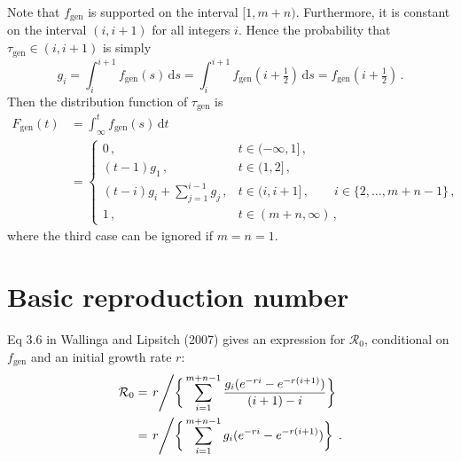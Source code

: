 \documentclass[12pt]{article}
\newcommand{\tgen}{\tau_\text{gen}}
\newcommand{\fgen}{f_\text{gen}}
\newcommand{\Fgen}{F_\text{gen}}
\begin{document}
%
Note that $\fgen$ is supported on the interval $[1,m+n)$. Furthermore,
it is constant on the interval $(i,i+1)$ for all integers $i$. Hence
the probability that $\tgen \in (i,i+1)$ is simply
%
\begin{equation}
    g_i = \int_{i}^{i+1} \fgen(s)\,\text{d}s = \int_{i}^{i+1} \fgen(i+\tfrac{1}{2})\,\text{d}s = \fgen(i+\tfrac{1}{2})\,.
\end{equation}
%
Then the distribution function of $\tgen$ is
%
\begin{equation}
  \begin{aligned}
    \Fgen(t)
    &= \int_{\infty}^{t} \fgen(s)\,\text{d}t \\
    &= \begin{cases}
      0\,, & t \in (-\infty,1]\,, \\
      (t-1) g_1\,, & t \in (1,2]\,, \\
      (t-i) g_i + \sum_{j=1}^{i-1} g_j\,, & t \in (i,i+1]\,,\qquad i \in \{2,\ldots,m+n-1\}\,, \\
      1\,, & t \in (m+n,\infty)\,,
    \end{cases}
  \end{aligned}
\end{equation}
%
where the third case can be ignored if $m = n = 1$.

            
\section{Basic reproduction number}

Eq 3.6 in Wallinga and Lipsitch (2007) gives an expression for 
$\mathcal{R}_0$, conditional on $\fgen$ and an initial growth rate $r$:
%
\begin{equation}
  \begin{aligned}
    \mathcal{R}_0
    &= \left. r \middle/ \bigg\{\sum_{i=1}^{m+n-1} \frac{g_i (e^{-r i} - e^{-r (i+1)})}{(i+1) - i}\bigg\} \right. \\
    &= \left. r \middle/ \bigg\{\sum_{i=1}^{m+n-1} g_i (e^{-r i} - e^{-r (i+1)})\bigg\} \right.\,.
   \end{aligned}
\end{equation}
\end{document}
